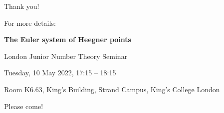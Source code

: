 \documentclass[10pt]{beamer}
\theoremstyle{definition}
\begin{document}
\begin{frame}{Thank you!}

\begin{center}
For more details:

\vspace{0.5cm}

\textbf{\large The Euler system of Heegner points}

\vspace{0.5cm}

{\small London Junior Number Theory Seminar}

{\footnotesize Tuesday, 10 May 2022, 17:15 -- 18:15}

{\scriptsize Room K6.63, King's Building, Strand Campus, King's College London}

\vspace{0.5cm}

Please come! \Smiley
\end{center}

\end{frame}
\end{document}
